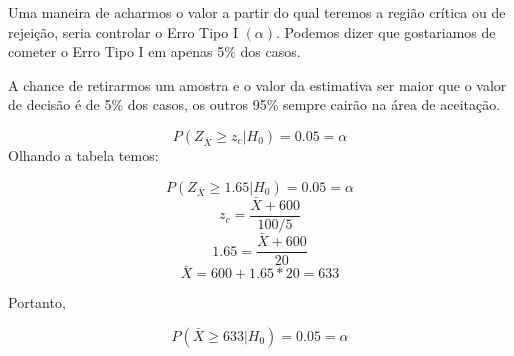 \documentclass[
  letterpaper,
  DIV=11,
  numbers=noendperiod]{scrreprt}
\begin{document}
Uma maneira de acharmos o valor a partir do qual teremos a região
crítica ou de rejeição, seria controlar o Erro Tipo I \((\alpha)\).
Podemos dizer que gostariamos de cometer o Erro Tipo I em apenas 5\% dos
casos.

\begin{tcolorbox}[enhanced jigsaw, leftrule=.75mm, coltitle=black, colframe=quarto-callout-note-color-frame, toprule=.15mm, opacitybacktitle=0.6, bottomtitle=1mm, bottomrule=.15mm, titlerule=0mm, toptitle=1mm, title=\textcolor{quarto-callout-note-color}{\faInfo}\hspace{0.5em}{Erro Estatístico}, arc=.35mm, breakable, opacityback=0, colbacktitle=quarto-callout-note-color!10!white, colback=white, left=2mm, rightrule=.15mm]

A chance de retirarmos um amostra e o valor da estimativa ser maior que
o valor de decisão é de 5\% dos casos, os outros 95\% sempre cairão na
área de aceitação.

\end{tcolorbox}

\[P(Z_{\bar{X}} \geq z_c|H_0)=0.05= \alpha\] Olhando a tabela temos:

\[P(Z_{\bar{X}} \geq 1.65|H_0)=0.05= \alpha\]
\[z_c =\frac{\bar{X}+600}{100/5}\] \[1.65 = \frac{\bar{X}+600}{20}\]
\[\bar{X}=600+1.65*20=633\]

Portanto,

\[P(\bar{X}\geq 633|H_0)=0.05= \alpha\]
\end{document}
